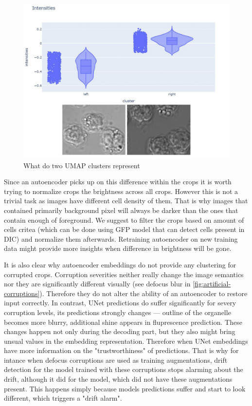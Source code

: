 \begin{figure}[H]
	\begin{center}
		\includegraphics[width=0.8\linewidth]{bilder/ae-embeddings/brighter-darker.png}
		\caption{What do two UMAP clusters represent}
		\label{fig:ae-brighter-darker}
	\end{center}
\end{figure}

Since an autoencoder picks up on this difference within the crops it is worth trying to normalize crops the brightness across all crops. However this is not a trivial task as images have different cell density of them. That is why images that contained primarily background pixel will always be darker than the ones that contain enough of foreground. We suggest to filter the crops based on amount of cells critea (which can be done using GFP model that can detect cells present in DIC) and normalize them afterwards. Retraining autoencoder on new training data might provide more insights when difference in brightness will be gone.

It is also clear why autoencoder embeddings do not provide any clustering for corrupted crops. Corruption severities neither really change the image semantics nor they are significantly different visually (see defocus blur in \ref{fig:artificial-corruptions}). Therefore they do not alter the ability of an autoencoder to restore input correctly. In contrast, UNet predictions do suffer significantly for severy corruption levels, its predictions strongly changes --- outline of the organelle becomes more blurry, additional shine appears in fluprescence prediction. These changes happen not only during the decoding part, but they also might bring unsual values in the embedding representation. Therefore when UNet embeddings have more information on the "trustworthiness" of predictions. That is why for intance when defocus corruptions are used as training augmentations, drift detection for the model trained with these corruptions stops alarming about the drift, although it did for the model, which did not have these augmentations present. This happens simply because models predictions suffer and start to look different, which triggers a "drift alarm".
